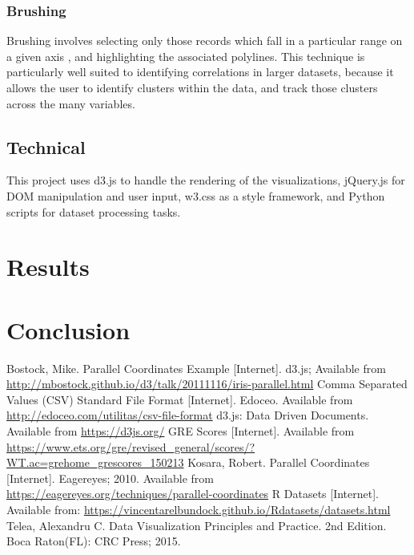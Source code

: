 \documentclass[]{article}
\begin{document}
		\subsubsection{Brushing}
			Brushing involves selecting only those records which fall in a particular range on a given axis \cite{bostock,kosara}, and highlighting the associated polylines. This technique is particularly well suited to identifying correlations in larger datasets, because it allows the user to identify clusters within the data, and track those clusters across the many variables.
	\subsection{Technical}
		This project uses d3.js to handle the rendering of the visualizations, jQuery.js for DOM manipulation and user input, w3.css as a style framework, and Python scripts for dataset processing tasks.
\section{Results}

\section{Conclusion}

\begin{thebibliography}{11}
		Bostock, Mike. Parallel Coordinates Example [Internet]. d3.js; Available from \url{http://mbostock.github.io/d3/talk/20111116/iris-parallel.html}
		Comma Separated Values (CSV) Standard File Format [Internet]. Edoceo. Available from \url{http://edoceo.com/utilitas/csv-file-format}
		d3.js: Data Driven Documents. Available from \url{https://d3js.org/}
		GRE Scores [Internet]. Available from \url{https://www.ets.org/gre/revised_general/scores/?WT.ac=grehome_grescores_150213}
		Kosara, Robert. Parallel Coordinates [Internet]. Eagereyes; 2010. Available from \url{https://eagereyes.org/techniques/parallel-coordinates}
		R Datasets [Internet]. Available from: \url{https://vincentarelbundock.github.io/Rdatasets/datasets.html}
		Telea, Alexandru C. Data Visualization Principles and Practice. 2nd Edition. Boca Raton(FL): CRC Press; 2015.


\end{thebibliography}
\end{document}

